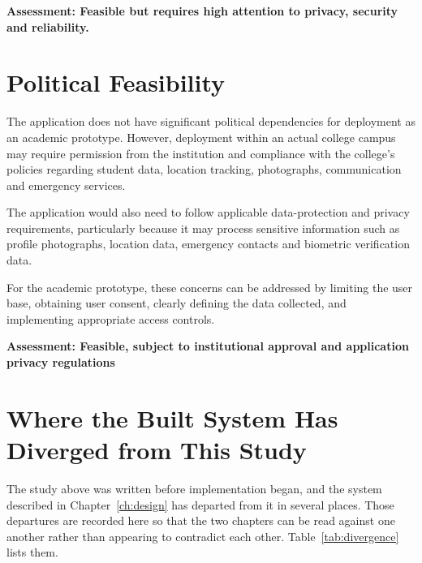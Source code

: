 \documentclass{tietreport}
\begin{document}
\noindent\textbf{Assessment: Feasible but requires high attention to privacy, security
and reliability.}

\section{Political Feasibility}

The application does not have significant political dependencies for deployment as an
academic prototype. However, deployment within an actual college campus may require
permission from the institution and compliance with the college's policies regarding
student data, location tracking, photographs, communication and emergency services.

The application would also need to follow applicable data-protection and privacy
requirements, particularly because it may process sensitive information such as profile
photographs, location data, emergency contacts and biometric verification data.

For the academic prototype, these concerns can be addressed by limiting the user base,
obtaining user consent, clearly defining the data collected, and implementing appropriate
access controls.

\noindent\textbf{Assessment: Feasible, subject to institutional approval and application
privacy regulations}

\section{Where the Built System Has Diverged from This Study}
\label{sec:divergence}

The study above was written before implementation began, and the system described in
Chapter~\ref{ch:design} has departed from it in several places. Those departures are
recorded here so that the two chapters can be read against one another rather than
appearing to contradict each other. Table~\ref{tab:divergence} lists them.
\end{document}

